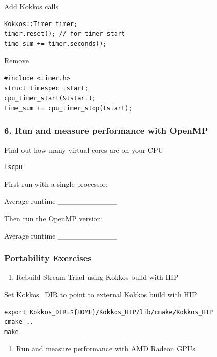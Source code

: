 \documentclass[
]{article}
\providecommand{\tightlist}{%
  \setlength{\itemsep}{0pt}\setlength{\parskip}{0pt}}
\providecommand{\tightlist}{%
  \setlength{\itemsep}{0pt}\setlength{\parskip}{0pt}}
\begin{document}
Add Kokkos calls

\begin{verbatim}
Kokkos::Timer timer;
timer.reset(); // for timer start
time_sum += timer.seconds();
\end{verbatim}

Remove

\begin{verbatim}
#include <timer.h>
struct timespec tstart;
cpu_timer_start(&tstart);
time_sum += cpu_timer_stop(tstart);
\end{verbatim}

\hypertarget{run-and-measure-performance-with-openmp}{%
\subsubsection{6. Run and measure performance with
OpenMP}\label{run-and-measure-performance-with-openmp}}

Find out how many virtual cores are on your CPU

\begin{verbatim}
lscpu
\end{verbatim}

First run with a single processor:

Average runtime \_\_\_\_\_\_\_\_\_\_\_

Then run the OpenMP version:

Average runtime \_\_\_\_\_\_\_\_\_\_\_

\hypertarget{portability-exercises}{%
\subsubsection{Portability Exercises}\label{portability-exercises}}

\begin{enumerate}
\def\labelenumi{\arabic{enumi}.}
\tightlist
\item
  Rebuild Stream Triad using Kokkos build with HIP
\end{enumerate}

Set Kokkos\_DIR to point to external Kokkos build with HIP

\begin{verbatim}
export Kokkos_DIR=${HOME}/Kokkos_HIP/lib/cmake/Kokkos_HIP
cmake ..
make
\end{verbatim}

\begin{enumerate}
\def\labelenumi{\arabic{enumi}.}
\setcounter{enumi}{1}
\tightlist
\item
  Run and measure performance with AMD Radeon GPUs
\end{enumerate}
\end{document}
